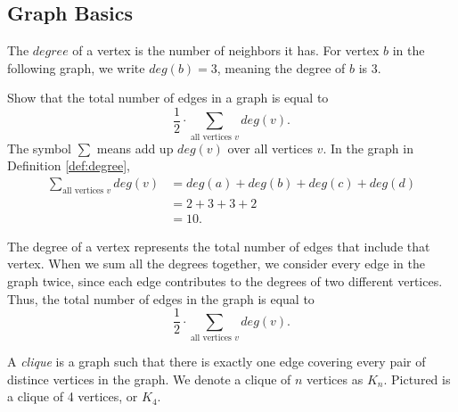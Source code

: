 \documentclass[11pt]{article}
\begin{document}
\subsection{Graph Basics}

\begin{definition}
\label{def:degree}
The $degree$ of a vertex is the number of neighbors it has. For vertex $b$ in the following graph, we write $deg(b) = 3$,
meaning the degree of $b$ is 3.
\begin{center}
\end{center}
\end{definition}

\begin{problem} %
Show that the total number of edges in a graph is equal to
\[\frac{1}{2} \cdot \sum_{\text{all vertices $v$}} deg(v).\]
The symbol $\sum$ means add up $deg(v)$ over all vertices $v$. In the graph in Definition \ref{def:degree},
\begin{align*}
\sum_{\text{all vertices $v$}} deg(v) &= deg(a) + deg(b) + deg(c) + deg(d) \\
&= 2 + 3 + 3 + 2 \\
&= 10.
\end{align*}
\end{problem}

\begin{solution}
The degree of a vertex represents the total number of edges that include that vertex. When we sum all the degrees together,
we consider every edge in the graph twice, since each edge contributes to the degrees of two different vertices. Thus, the total number
of edges in the graph is equal to 
\[\frac{1}{2} \cdot \sum_{\text{all vertices $v$}} deg(v).\]
\end{solution}

\begin{definition}
\label{def:clique}
A \textit{clique} is a graph such that there is exactly one edge covering every pair of distince vertices in the graph.
We denote a clique of $n$ vertices as $K_n$.
Pictured is a clique of 4 vertices, or $K_4$.
\begin{center}
\end{center}
\end{definition}
\end{document}
